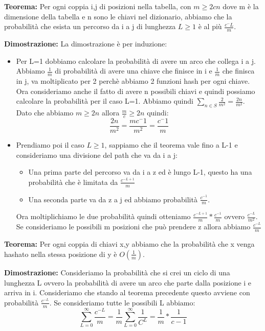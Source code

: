 \documentclass[12pt]{article}
\begin{document}
\textbf{Teorema:} Per ogni coppia i,j di posizioni nella tabella, con $m\geq 2cn$ dove m è la dimensione della tabella e n sono le chiavi nel dizionario, abbiamo che la probabilità che esista un percorso da i a j di lunghezza $L \geq 1$ è al più $\frac{c^-L}{m}$. 

\textbf{Dimostrazione:} La dimostrazione è per induzione:
\begin{itemize}
\item Per L=1 dobbiamo calcolare la probabilità di avere un arco che collega i a j. Abbiamo $\frac{1}{m}$ di probabilità di avere una chiave che finisce in i e $\frac{1}{m}$ che finisca in j, va moltiplicato per 2 perchè abbiamo 2 funzioni hash per ogni chiave. Ora consideriamo anche il fatto di avere n possibili chiavi e quindi possiamo calcolare la probabilità per il caso L=1. Abbiamo quindi $\sum_{n \in S}\frac{2}{m^2} = \frac{2n}{m^2}$. Dato che abbiamo $m\geq 2n$ allora $\frac{m}{c}\geq 2n$ quindi:
\begin{equation}
\frac{2n}{m^2} = \frac{mc^-1}{m^2} = \frac{c^-1}{m}
\end{equation}

\item Prendiamo poi il caso $L\geq1$, sappiamo che il teorema vale fino a L-1 e consideriamo una divisione del path che va da i a j:
\begin{itemize}
\item Una prima parte del percorso va da i a z ed è lungo L-1, questo ha una probabilità che è limitata da $\frac{c^{-L+1}}{m}$
\item Una seconda parte va da z a j ed abbiamo probabilità $\frac{c^{-1}}{m}$. 
\end{itemize}
Ora moltiplichiamo le due probabilità quindi otteniamo $\frac{c^{-L+1}}{m}*\frac{c^{-1}}{m}$ ovvero $\frac{c^{-L}}{m^2}$. Se consideriamo le possibili m posizioni che può prendere z allora abbiamo $\frac{c^{-L}}{m}$
\end{itemize}


\textbf{Teorema:} Per ogni coppia di chiavi x,y abbiamo che la probabilità che x venga hashato nella stessa posizione di y è $O(\frac{1}{m})$.

\textbf{Dimostrazione:} Consideriamo la probabilità che si crei un ciclo di una lunghezza L ovvero la probabilità di avere un arco che parte dalla posizione i e arriva in i. Consideriamo che stando al teorema precedente questo avviene con probabilità $\frac{c^{-L}}{m}$. 
Se consideriamo tutte le possibili L abbiamo:
\begin{equation}
\sum^{\infty}_{L=0}\frac{c^{-L}}{m} = \frac{1}{m}\sum^{\infty}_{L=0}\frac{1}{C^L} = \frac{1}{m}*\frac{1}{c-1}
\end{equation}
\end{document}
